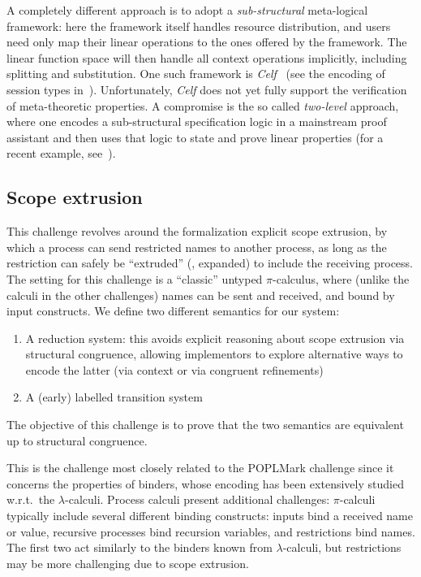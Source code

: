 \documentclass[runningheads]{llncs}
\begin{document}
A completely different approach is to adopt a \emph{sub-structural} meta-logical framework: here the framework itself handles resource distribution, and users need only map their linear operations to the ones offered by the framework.
The linear function space will then handle all context operations implicitly, including splitting and substitution.
One such framework is \emph{Celf}~\cite{Schack-Nielsen:IJCAR08} (see the encoding of session types in~\cite{Bock2016}).
Unfortunately, \emph{Celf} does not yet fully support the verification of meta-theoretic properties.
A compromise is the so called \emph{two-level} approach, where one encodes a sub-structural specification logic in a mainstream proof assistant and then uses that logic to state and prove linear properties (for a recent example, see~\cite{Felty:MSCS21}).

\subsection{Scope extrusion}

This challenge revolves around the formalization explicit scope
extrusion, by which a process can send restricted names to another
process, as long as the restriction can safely be ``extruded'' (\ie,
expanded) to include the receiving process.  
The setting for this challenge is a ``classic'' untyped
\( \pi \)-calculus, where (unlike the calculi in the other challenges)
names can be sent and received, and bound by input constructs.  We define two
different semantics for our system:
\begin{enumerate}
\item A reduction system: this avoids explicit reasoning
about scope extrusion via structural congruence, allowing implementors to explore
alternative ways to encode the latter (\eg via context or via congruent refinements)
\item A (early) labelled transition system
\end{enumerate}
The objective of this
challenge is to prove that the two semantics are equivalent up to
structural congruence.


This is the challenge most closely related to the POPLMark challenge
since it concerns the properties of binders, whose encoding has been
extensively studied w.r.t.\ the $\lambda$-calculi. Process calculi
present additional challenges: $\pi$-calculi typically include several
different binding constructs: inputs bind a received name or value,
recursive processes bind recursion variables, and restrictions bind
names.  The first two act similarly to the binders known from
$\lambda$-calculi, but restrictions may be more challenging due to
scope extrusion.
\end{document}
